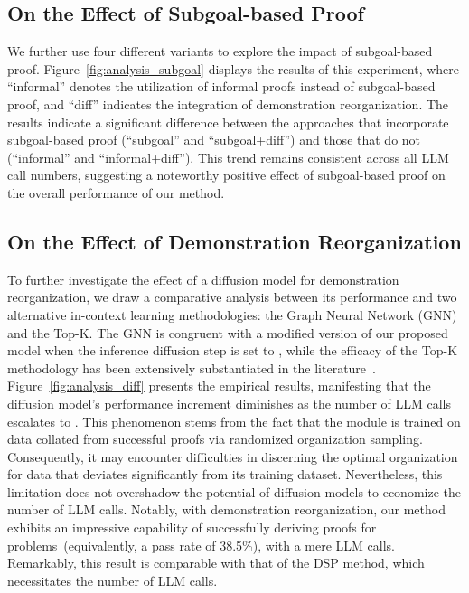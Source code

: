 \documentclass{article}
\begin{document}
\subsection{On the Effect of Subgoal-based Proof}
\label{sec:analysis_subgoal}

We further use four different variants to explore the impact of subgoal-based proof. Figure~\ref{fig:analysis_subgoal} displays the results of this experiment, where ``informal'' denotes the utilization of informal proofs instead of subgoal-based proof, and ``diff'' indicates the integration of demonstration reorganization. The results indicate a significant difference between the approaches that incorporate subgoal-based proof (``subgoal'' and ``subgoal+diff'') and those that do not (``informal'' and ``informal+diff''). This trend remains consistent across all LLM call numbers, suggesting a noteworthy positive effect of subgoal-based proof on the overall performance of our method. 

\subsection{On the Effect of Demonstration Reorganization}
\label{sec:analysis_diff}
To further investigate the effect of a diffusion model for demonstration reorganization, we draw a comparative analysis between its performance and two alternative in-context learning methodologies: the Graph Neural Network (GNN) and the Top-K. The GNN is congruent with a modified version of our proposed model when the inference diffusion step is set to , while the efficacy of the Top-K methodology has been extensively substantiated in the literature~\cite{liu2021makes}.
Figure~\ref{fig:analysis_diff} presents the empirical results, manifesting that the diffusion model's performance increment diminishes as the number of LLM calls escalates to . This phenomenon stems from the fact that the module is trained on data collated from successful proofs via randomized organization sampling. Consequently, it may encounter difficulties in discerning the optimal organization for data that deviates significantly from its training dataset. Nevertheless, this limitation does not overshadow the potential of diffusion models to economize the number of LLM calls.
Notably, with demonstration reorganization, our method exhibits an impressive capability of successfully deriving proofs for  problems~(equivalently, a pass rate of 38.5\%), with a mere  LLM calls. Remarkably, this result is comparable with that of the DSP method, which necessitates  the number of LLM calls.
\end{document}
